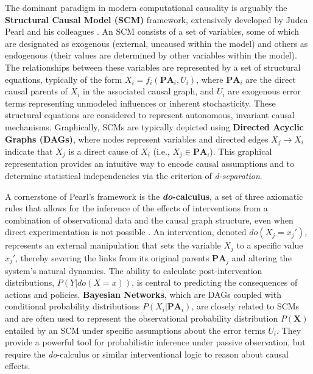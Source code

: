 The dominant paradigm in modern computational causality is arguably the \textbf{Structural Causal Model (SCM)} framework, extensively developed by Judea Pearl and his colleagues \cite{Pearl2009Causality}. An SCM consists of a set of variables, some of which are designated as exogenous (external, uncaused within the model) and others as endogenous (their values are determined by other variables within the model). The relationships between these variables are represented by a set of structural equations, typically of the form $X_i = f_i(\mathbf{PA}_i, U_i)$, where $\mathbf{PA}_i$ are the direct causal parents of $X_i$ in the associated causal graph, and $U_i$ are exogenous error terms representing unmodeled influences or inherent stochasticity. These structural equations are considered to represent autonomous, invariant causal mechanisms. Graphically, SCMs are typically depicted using \textbf{Directed Acyclic Graphs (DAGs)}, where nodes represent variables and directed edges $X_j \to X_i$ indicate that $X_j$ is a direct cause of $X_i$ (i.e., $X_j \in \mathbf{PA}_i$). This graphical representation provides an intuitive way to encode causal assumptions and to determine statistical independencies via the criterion of \textit{d-separation}.

A cornerstone of Pearl's framework is the \textbf{\textit{do}-calculus}, a set of three axiomatic rules that allows for the inference of the effects of interventions from a combination of observational data and the causal graph structure, even when direct experimentation is not possible \cite{Pearl2009Causality}. An intervention, denoted $do(X_j=x_j')$, represents an external manipulation that sets the variable $X_j$ to a specific value $x_j'$, thereby severing the links from its original parents $\mathbf{PA}_j$ and altering the system's natural dynamics. The ability to calculate post-intervention distributions, $P(Y | do(X=x))$, is central to predicting the consequences of actions and policies. \textbf{Bayesian Networks}, which are DAGs coupled with conditional probability distributions $P(X_i | \mathbf{PA}_i)$, are closely related to SCMs and are often used to represent the observational probability distribution $P(\mathbf{X})$ entailed by an SCM under specific assumptions about the error terms $U_i$. They provide a powerful tool for probabilistic inference under passive observation, but require the \textit{do}-calculus or similar interventional logic to reason about causal effects.

